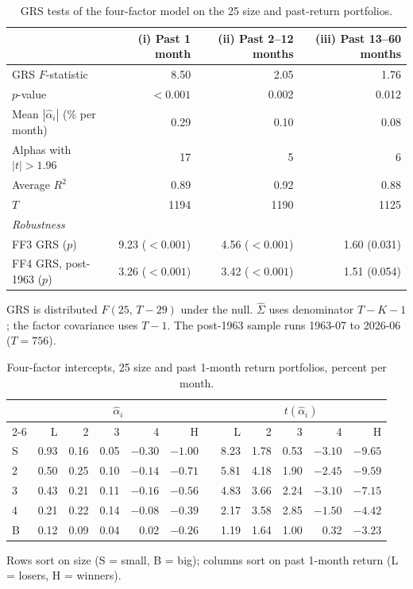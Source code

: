 \documentclass[11pt]{article}
\begin{document}
\begin{table}[H]
\centering
\caption{GRS tests of the four-factor model on the 25 size and past-return portfolios.}
\small
\begin{tabular}{lrrr}
\toprule
& (i) Past 1 month & (ii) Past 2--12 months & (iii) Past 13--60 months \\
\midrule
GRS $F$-statistic & 8.50 & 2.05 & 1.76 \\
$p$-value & $<0.001$ & 0.002 & 0.012 \\
Mean $|\hat\alpha_i|$ (\% per month) & 0.29 & 0.10 & 0.08 \\
Alphas with $|t| > 1.96$ & 17 & 5 & 6 \\
Average $R^2$ & 0.89 & 0.92 & 0.88 \\
$T$ & 1194 & 1190 & 1125 \\
\midrule
\multicolumn{4}{l}{\textit{Robustness}} \\
FF3 GRS ($p$) & 9.23 ($<0.001$) & 4.56 ($<0.001$) & 1.60 (0.031) \\
FF4 GRS, post-1963 ($p$) & 3.26 ($<0.001$) & 3.42 ($<0.001$) & 1.51 (0.054) \\
\bottomrule
\end{tabular}
\vspace{2pt}\begin{minipage}{0.93\textwidth}\footnotesize
GRS is distributed $F(25,\,T-29)$ under the null. $\hat\Sigma$ uses denominator $T-K-1$; the factor covariance uses $T-1$. The post-1963 sample runs 1963-07 to 2026-06 ($T = 756$).
\end{minipage}
\end{table}

\begin{table}[H]
\centering
\caption{Four-factor intercepts, 25 size and past 1-month return portfolios, percent per month.}
\small
\begin{tabular}{lrrrrrcrrrrr}
\toprule
& \multicolumn{5}{c}{$\hat\alpha_i$} && \multicolumn{5}{c}{$t(\hat\alpha_i)$} \\
\cmidrule{2-6}\cmidrule{8-12}
& L & 2 & 3 & 4 & H && L & 2 & 3 & 4 & H \\
\midrule
S & 0.93 & 0.16 & 0.05 & $-0.30$ & $-1.00$ && 8.23 & 1.78 & 0.53 & $-3.10$ & $-9.65$ \\
2 & 0.50 & 0.25 & 0.10 & $-0.14$ & $-0.71$ && 5.81 & 4.18 & 1.90 & $-2.45$ & $-9.59$ \\
3 & 0.43 & 0.21 & 0.11 & $-0.16$ & $-0.56$ && 4.83 & 3.66 & 2.24 & $-3.10$ & $-7.15$ \\
4 & 0.21 & 0.22 & 0.14 & $-0.08$ & $-0.39$ && 2.17 & 3.58 & 2.85 & $-1.50$ & $-4.42$ \\
B & 0.12 & 0.09 & 0.04 & 0.02 & $-0.26$ && 1.19 & 1.64 & 1.00 & 0.32 & $-3.23$ \\
\bottomrule
\end{tabular}
\vspace{2pt}\begin{minipage}{0.93\textwidth}\footnotesize
Rows sort on size (S = small, B = big); columns sort on past 1-month return (L = losers, H = winners).
\end{minipage}
\end{table}
\end{document}
